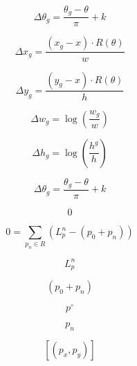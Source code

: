\documentclass[journal]{IEEEtran}
\begin{document}
\begin{equation}
\Delta \theta_g = \frac{\theta_g - \theta}{\pi} + k
\label{eq:eq_37}
\end{equation}

\begin{equation}
\Delta x_g = \frac{(x_g - x) \cdot R(\theta)}{w}
\label{eq:eq_38}
\end{equation}

\begin{equation}
\Delta y_g = \frac{(y_g - x) \cdot R(\theta)}{h}
\label{eq:eq_39}
\end{equation}

\begin{equation}
\Delta w_g = \log\left( \frac{w_g}{w} \right)
\label{eq:eq_40}
\end{equation}

\begin{equation}
\Delta h_g = \log\left( \frac{h^g}{h} \right)
\label{eq:eq_41}
\end{equation}

\begin{equation}
\Delta \theta_g = \frac{\theta_g - \theta}{\pi} + k
\label{eq:eq_42}
\end{equation}

\begin{equation}
0
\label{eq:eq_43}
\end{equation}

\begin{equation}
0 = \sum_{p_n \in R} \left( L_p^n - (p_0 + p_n) \right)
\label{eq:eq_44}
\end{equation}

\begin{equation}
L^n_p
\label{eq:eq_45}
\end{equation}

\begin{equation}
(p_0 + p_n)
\label{eq:eq_46}
\end{equation}

\begin{equation}
p^\circ
\label{eq:eq_47}
\end{equation}

\begin{equation}
p_n
\label{eq:eq_48}
\end{equation}

\begin{equation}
\left[ (p_x, p_y) \right]
\label{eq:eq_49}
\end{equation}
\end{document}
